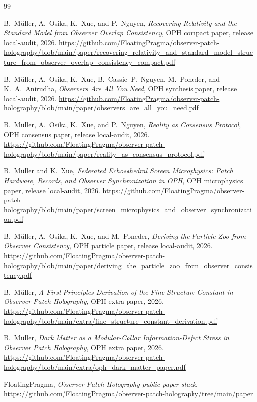 \documentclass[11pt]{article}
\newcommand{\OPHPaperReleaseID}{local-audit}
\begin{document}
\begin{thebibliography}{99}

B.~M\"uller, A.~Osika, K.~Xue, and P.~Nguyen,
\emph{Recovering Relativity and the Standard Model from Observer Overlap Consistency},
OPH compact paper, release \OPHPaperReleaseID, 2026.
\url{https://github.com/FloatingPragma/observer-patch-holography/blob/main/paper/recovering_relativity_and_standard_model_structure_from_observer_overlap_consistency_compact.pdf}

B.~M\"uller, A.~Osika, K.~Xue, B.~Cassie, P.~Nguyen, M.~Poneder, and K.~A.~Anirudha,
\emph{Observers Are All You Need},
OPH synthesis paper, release \OPHPaperReleaseID, 2026.
\url{https://github.com/FloatingPragma/observer-patch-holography/blob/main/paper/observers_are_all_you_need.pdf}

B.~M\"uller, A.~Osika, K.~Xue, and P.~Nguyen,
\emph{Reality as Consensus Protocol},
OPH consensus paper, release \OPHPaperReleaseID, 2026.
\url{https://github.com/FloatingPragma/observer-patch-holography/blob/main/paper/reality_as_consensus_protocol.pdf}

B.~M\"uller and K.~Xue,
\emph{Federated Echosahedral Screen Microphysics: Patch Hardware, Records, and Observer Synchronization in OPH},
OPH microphysics paper, release \OPHPaperReleaseID, 2026.
\url{https://github.com/FloatingPragma/observer-patch-holography/blob/main/paper/screen_microphysics_and_observer_synchronization.pdf}

B.~M\"uller, A.~Osika, K.~Xue, and M.~Poneder,
\emph{Deriving the Particle Zoo from Observer Consistency},
OPH particle paper, release \OPHPaperReleaseID, 2026.
\url{https://github.com/FloatingPragma/observer-patch-holography/blob/main/paper/deriving_the_particle_zoo_from_observer_consistency.pdf}

B.~M\"uller,
\emph{A First-Principles Derivation of the Fine-Structure Constant in Observer Patch Holography},
OPH extra paper, 2026.
\url{https://github.com/FloatingPragma/observer-patch-holography/blob/main/extra/fine_structure_constant_derivation.pdf}

B.~M\"uller,
\emph{Dark Matter as a Modular-Collar Information-Defect Stress in Observer Patch Holography},
OPH extra paper, 2026.
\url{https://github.com/FloatingPragma/observer-patch-holography/blob/main/extra/oph_dark_matter_paper.pdf}

FloatingPragma,
\emph{Observer Patch Holography public paper stack}.
\url{https://github.com/FloatingPragma/observer-patch-holography/tree/main/paper}


\end{thebibliography}
\end{document}
